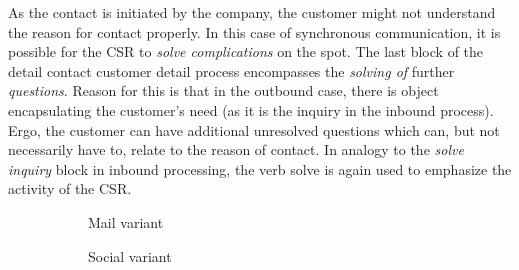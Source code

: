 		As the contact is initiated by the company, the customer might not understand the reason for contact properly. In this case of synchronous communication, it is possible for the \acrshort{CSR} to\textit{ solve complications} on the spot. The last block of the detail contact customer detail process encompasses the \textit{solving of }further \textit{questions}. Reason for this is that in the outbound case, there is object encapsulating the customer's need (as it is the inquiry in the inbound process). Ergo, the customer can have additional unresolved questions which can, but not necessarily have to, relate to the reason of contact. In analogy to the \textit{solve inquiry} block in inbound processing, the verb solve is again used to emphasize the activity of the  \acrshort{CSR}. 
		
		
		\begin{figure}[caption={Contact customer detail process}, label={fig:outbound:con}]
		
		\begin{subfigure}[b]{.45\textwidth}
			\centering
			
			\caption{Mail variant}\label{fig:outbound:con:mail}
		\end{subfigure}
		\begin{subfigure}[b]{.45\textwidth}
			\centering	
			\caption{Social variant}\label{fig:outbound:con:social}
		\end{subfigure}
		\begin{subfigure}[b]{.45\textwidth}
			\centering	
\end{subfigure}
\end{figure}
